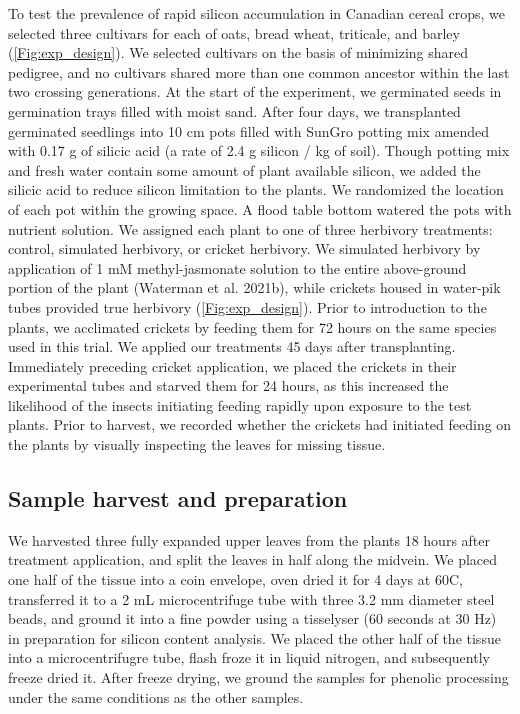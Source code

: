 \documentclass[12pt, letterpaper, ]{report}
\begin{document}
To test the prevalence of rapid silicon accumulation in Canadian cereal crops, we selected three cultivars for each of oats, bread wheat, triticale, and barley (\ref{Fig:exp_design}). We selected cultivars on the basis of minimizing shared pedigree, and no cultivars shared more than one common ancestor within the last two crossing generations. At the start of the experiment, we germinated seeds in germination trays filled with moist sand. After four days, we transplanted germinated seedlings into 10 cm pots filled with SunGro potting mix amended with 0.17 g of silicic acid (a rate of 2.4 g silicon / kg of soil). Though potting mix and fresh water contain some amount of plant available silicon, we added the silicic acid to reduce silicon limitation to the plants. We randomized the location of each pot within the growing space. A flood table bottom watered the pots with nutrient solution. We assigned each plant to one of three herbivory treatments: control, simulated herbivory, or cricket herbivory. We simulated herbivory by application of 1 mM methyl-jasmonate solution to the entire above-ground portion of the plant (Waterman et al. 2021b), while crickets housed in water-pik tubes provided true herbivory (\ref{Fig:exp_design}). Prior to introduction to the plants, we acclimated crickets by feeding them for 72 hours on the same species used in this trial. We applied our treatments 45 days after transplanting. Immediately preceding cricket application, we placed the crickets in their experimental tubes and starved them for 24 hours, as this increased the likelihood of the insects initiating feeding rapidly upon exposure to the test plants. Prior to harvest, we recorded whether the crickets had initiated feeding on the plants by visually inspecting the leaves for missing tissue. 

\subsection{Sample harvest and preparation}

We harvested three fully expanded upper leaves from the plants 18 hours after treatment application, and split the leaves in half along the midvein. We placed one half of the tissue into a coin envelope, oven dried it for 4 days at 60\degree C, transferred it to a 2 mL microcentrifuge tube with three 3.2 mm diameter steel beads, and ground it into a fine powder using a tisselyser (60 seconds at 30 Hz) in preparation for silicon content analysis. We placed the other half of the tissue into a microcentrifugre tube, flash froze it in liquid nitrogen, and subsequently freeze dried it. After freeze drying, we ground the samples for phenolic processing under the same conditions as the other samples.
\end{document}
